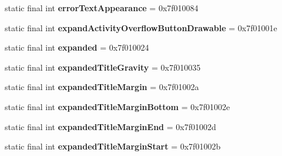 \begin{DoxyCompactItemize}
\item 
\hypertarget{classandroid_1_1support_1_1design_1_1_r_1_1attr_aff80f59fbd99ca8b22758a04767ac7d5}{}static final int {\bfseries error\+Text\+Appearance} = 0x7f010084\label{classandroid_1_1support_1_1design_1_1_r_1_1attr_aff80f59fbd99ca8b22758a04767ac7d5}

\item 
\hypertarget{classandroid_1_1support_1_1design_1_1_r_1_1attr_a294fef173d17119d81a2a22e1b059994}{}static final int {\bfseries expand\+Activity\+Overflow\+Button\+Drawable} = 0x7f01001e\label{classandroid_1_1support_1_1design_1_1_r_1_1attr_a294fef173d17119d81a2a22e1b059994}

\item 
\hypertarget{classandroid_1_1support_1_1design_1_1_r_1_1attr_a8b2f1952a1f1858370c55b77a5c8fdf0}{}static final int {\bfseries expanded} = 0x7f010024\label{classandroid_1_1support_1_1design_1_1_r_1_1attr_a8b2f1952a1f1858370c55b77a5c8fdf0}

\item 
\hypertarget{classandroid_1_1support_1_1design_1_1_r_1_1attr_af9227f3d0dd94b70bf8560495793ef46}{}static final int {\bfseries expanded\+Title\+Gravity} = 0x7f010035\label{classandroid_1_1support_1_1design_1_1_r_1_1attr_af9227f3d0dd94b70bf8560495793ef46}

\item 
\hypertarget{classandroid_1_1support_1_1design_1_1_r_1_1attr_aa82f302d274ae27a8c9353fadca028c8}{}static final int {\bfseries expanded\+Title\+Margin} = 0x7f01002a\label{classandroid_1_1support_1_1design_1_1_r_1_1attr_aa82f302d274ae27a8c9353fadca028c8}

\item 
\hypertarget{classandroid_1_1support_1_1design_1_1_r_1_1attr_a3eab7e6efce6d1e0bab6faf32ed77c76}{}static final int {\bfseries expanded\+Title\+Margin\+Bottom} = 0x7f01002e\label{classandroid_1_1support_1_1design_1_1_r_1_1attr_a3eab7e6efce6d1e0bab6faf32ed77c76}

\item 
\hypertarget{classandroid_1_1support_1_1design_1_1_r_1_1attr_ad547616c8f37d753a16d55b3af437504}{}static final int {\bfseries expanded\+Title\+Margin\+End} = 0x7f01002d\label{classandroid_1_1support_1_1design_1_1_r_1_1attr_ad547616c8f37d753a16d55b3af437504}

\item 
\hypertarget{classandroid_1_1support_1_1design_1_1_r_1_1attr_a117547f2f75572ed87f35bf8d2174c3c}{}static final int {\bfseries expanded\+Title\+Margin\+Start} = 0x7f01002b\label{classandroid_1_1support_1_1design_1_1_r_1_1attr_a117547f2f75572ed87f35bf8d2174c3c}


\end{DoxyCompactItemize}
